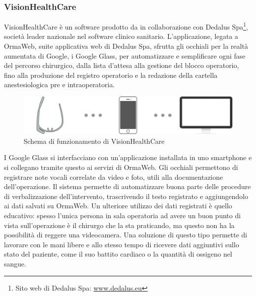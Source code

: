    \subsubsection{VisionHealthCare}
   VisionHealthCare è un software prodotto da \nomeAzienda{} in collaborazione con Dedalus Spa\footnote{Sito web di Dedalus Spa: \href{http://www.dedalus.eu}{www.dedalus.eu}}, società leader nazionale nel software clinico sanitario. L'applicazione, legata a OrmaWeb, suite applicativa web di Dedalus Spa, sfrutta gli occhiali per la realtà aumentata di Google, i Google Glass, per automatizzare e semplificare ogni fase del percorso chirurgico, dalla lista d'attesa alla gestione del blocco operatorio, fino alla produzione del registro operatorio e la redazione della cartella anestesiologica pre e intraoperatoria.
   \begin{figure}[H]
      \begin{center}
         \includegraphics[width=15cm,keepaspectratio]{immagini/visionhealthcare-schema}
      \end{center}
      \caption{Schema di funzionamento di VisionHealthCare}\label{schemavisionhealthcare}
   \end{figure}
   I Google Glass si interfacciano con un'applicazione installata in uno smartphone e si collegano tramite questo ai servizi di OrmaWeb.
   Gli occhiali permettono di registrare note vocali correlate da video e foto, utili alla documentazione dell'operazione. Il sistema permette di automatizzare buona parte delle procedure di verbalizzazione dell'intervento, trascrivendo il testo registrato e aggiungendolo ai dati salvati su OrmaWeb. Un ulteriore utilizzo dei dati registrati è quello educativo: spesso l'unica persona in sala operatoria ad avere un buon punto di vista sull'operazione è il chirurgo che la sta praticando, ma questo non ha la possibilità di reggere una videocamera. Una soluzione di questo tipo permette di lavorare con le mani libere e allo stesso tempo di ricevere dati aggiuntivi sullo stato del paziente, come il suo battito cardiaco o la quantità di ossigeno nel sangue.

